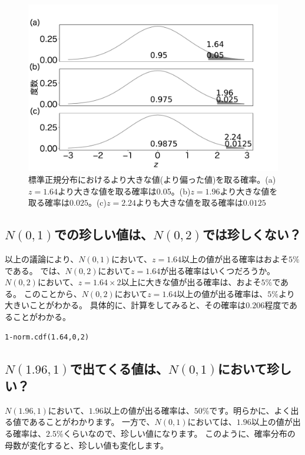 \begin{figure}
    \begin{center}
        \includegraphics[width=15cm]{./image/02_/z_value_larger.pdf}
        \caption{標準正規分布におけるより大きな値(より偏った値)を取る確率。(a)$z=1.64$より大きな値を取る確率は0.05。(b)$z=1.96$より大きな値を取る確率は$0.025$。(c)$z=2.24$よりも大きな値を取る確率は$0.0125$}
        \label{fig:z_value_larger}
      \end{center}
    \end{figure}

\subsection{$N(0,1)$での珍しい値は、$N(0,2)$では珍しくない？}
以上の議論により、$N(0,1)$において、$z=1.64$以上の値が出る確率はおよそ$5\%$である。
では、$N(0,2)$において$z=1.64$が出る確率はいくつだろうか。
$N(0,2)$において、$z=1.64\times2$以上に大きな値が出る確率は、およそ$5\%$である。
このことから、$N(0,2)$において$z=1.64$以上の値が出る確率は、$5\%$より大きいことがわかる。
具体的に、計算をしてみると、その確率は$0.206$程度であることがわかる。
\begin{lstlisting}
1-norm.cdf(1.64,0,2)
\end{lstlisting}

\subsection{$N(1.96,1)$で出てくる値は、$N(0,1)$において珍しい？}
$N(1.96,1)$において、$1.96$以上の値が出る確率は、$50\%$です。明らかに、よく出る値であることがわかります。
一方で、$N(0,1)$においては、$1.96$以上の値が出る確率は、$2.5\%$くらいなので、珍しい値になります。
このように、確率分布の母数が変化すると、珍しい値も変化します。




